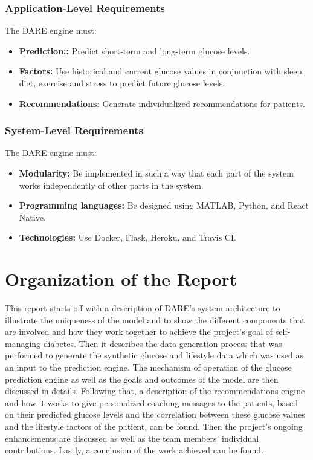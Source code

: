 \subsubsection{Application-Level Requirements}
The DARE engine must:
\begin{itemize}
    \item \textbf{Prediction::} Predict short-term and long-term glucose levels.
    \item \textbf{Factors:} Use historical and current glucose values in conjunction with sleep, diet, exercise and stress to predict future glucose levels.
    \item \textbf{Recommendations:} Generate individualized recommendations for patients.
\end{itemize}

\subsubsection{System-Level Requirements}
The DARE engine must:
\begin{itemize}
    \item \textbf{Modularity:} Be implemented in such a way that each part of the system works independently of other parts in the system.
    \item \textbf{Programming languages:} Be designed using MATLAB, Python, and React Native.
    \item \textbf{Technologies:} Use Docker, Flask, Heroku, and Travis CI.
\end{itemize}



\section{Organization of the Report}
\label{sec:organization_of_the_report}
This report starts off with a description of DARE's system architecture to illustrate the uniqueness of the model and to show the different components that are involved and how they work together to achieve the project's goal of self-managing diabetes. Then it describes the data generation process that was performed to generate the synthetic glucose and lifestyle data which was used as an input to the prediction engine. 
The mechanism of operation of the glucose prediction engine as well as the goals and outcomes of the model are then discussed in details. Following that, a description of the recommendations engine and how it works to give personalized coaching messages to the patients, based on their predicted glucose levels and the correlation between these glucose values and the lifestyle factors of the patient, can be found. Then the project's ongoing enhancements are discussed as well as the team members' individual contributions. Lastly, a conclusion of the work achieved can be found. 


